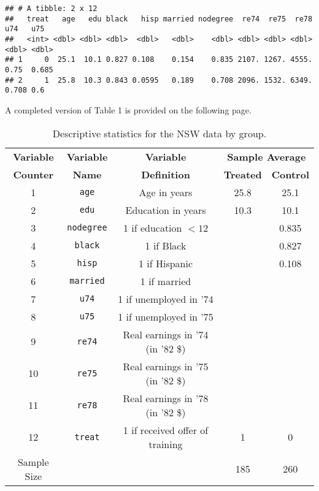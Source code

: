\documentclass[
]{article}
\begin{document}
\begin{verbatim}
## # A tibble: 2 x 12
##   treat   age   edu black   hisp married nodegree  re74  re75  re78   u74   u75
##   <int> <dbl> <dbl> <dbl>  <dbl>   <dbl>    <dbl> <dbl> <dbl> <dbl> <dbl> <dbl>
## 1     0  25.1  10.1 0.827 0.108    0.154    0.835 2107. 1267. 4555. 0.75  0.685
## 2     1  25.8  10.3 0.843 0.0595   0.189    0.708 2096. 1532. 6349. 0.708 0.6
\end{verbatim}

A completed version of Table 1 is provided on the following page.
\newpage

\begin{table}[!ht!]
\centering
\begin{tabular}{ccccc}
\hline
\textbf{Variable} & \textbf{Variable}    & \textbf{Variable}    & \multicolumn{2}{c}{\textbf{Sample Average}}    \\ \cline{4-5} 
\textbf{Counter} & \textbf{Name}       & \textbf{Definition}                        & \textbf{Treated} & \textbf{Control} \\ \hline
1 & \texttt{age}      & Age in years                     & 25.8        & 25.1       \\
2 & \texttt{edu}      & Education in years               & 10.3        & 10.1       \\
3 & \texttt{nodegree} & 1 if education $<12$             &             & 0.835      \\
4 & \texttt{black}    & 1 if Black                       &             & 0.827      \\
5 & \texttt{hisp}     & 1 if Hispanic                    &             & 0.108      \\
6 & \texttt{married}  & 1 if married                     &             &            \\
7 & \texttt{u74}      & 1 if unemployed in '74           &             &            \\
8 & \texttt{u75}      & 1 if unemployed in '75           &             &            \\
9 & \texttt{re74}     & Real earnings in '74 (in '82 \$) &             &            \\
10 & \texttt{re75}     & Real earnings in '75 (in '82 \$) &            &            \\
\hline
11 & \texttt{re78}     & Real earnings in '78 (in '82 \$) &             &           \\
12 & \texttt{treat}    & 1 if received offer of training  & 1           & 0                \\
\hline
Sample Size                        &                           &       & 185              & 260              \\ \hline
\end{tabular}
\caption{Descriptive statistics for the NSW data by group.}
\label{tab:Tab_NSW_1}
\end{table}
\end{document}
